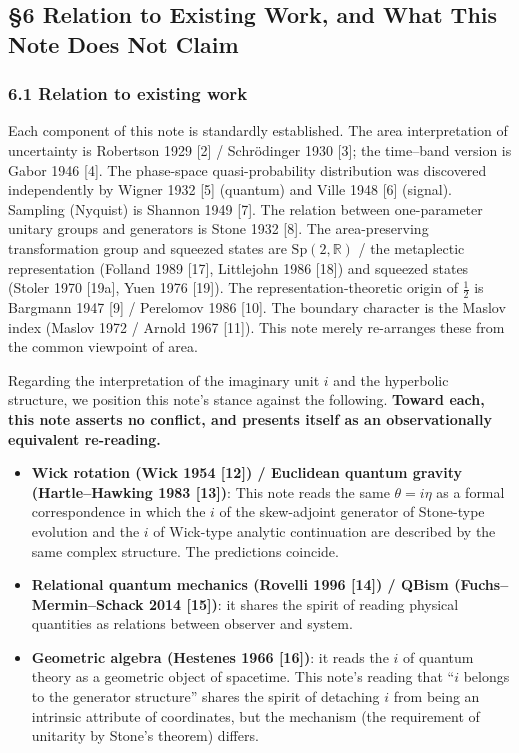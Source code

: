 \documentclass[
]{article}
\providecommand{\tightlist}{%
  \setlength{\itemsep}{0pt}\setlength{\parskip}{0pt}}
\begin{document}
\subsection{§6 Relation to Existing Work, and What This Note Does Not
Claim}\label{relation-to-existing-work-and-what-this-note-does-not-claim}

\subsubsection{6.1 Relation to existing
work}\label{relation-to-existing-work}

Each component of this note is standardly established. The area
interpretation of uncertainty is Robertson 1929 {[}2{]} / Schrödinger
1930 {[}3{]}; the time--band version is Gabor 1946 {[}4{]}. The
phase-space quasi-probability distribution was discovered independently
by Wigner 1932 {[}5{]} (quantum) and Ville 1948 {[}6{]} (signal).
Sampling (Nyquist) is Shannon 1949 {[}7{]}. The relation between
one-parameter unitary groups and generators is Stone 1932 {[}8{]}. The
area-preserving transformation group and squeezed states are
\(\mathrm{Sp}(2,\mathbb{R})\) / the metaplectic representation (Folland
1989 {[}17{]}, Littlejohn 1986 {[}18{]}) and squeezed states (Stoler
1970 {[}19a{]}, Yuen 1976 {[}19{]}). The representation-theoretic origin
of \(\tfrac12\) is Bargmann 1947 {[}9{]} / Perelomov 1986 {[}10{]}. The
boundary character is the Maslov index (Maslov 1972 / Arnold 1967
{[}11{]}). This note merely re-arranges these from the common viewpoint
of area.

Regarding the interpretation of the imaginary unit \(i\) and the
hyperbolic structure, we position this note's stance against the
following. \textbf{Toward each, this note asserts no conflict, and
presents itself as an observationally equivalent re-reading.}

\begin{itemize}
\tightlist
\item
  \textbf{Wick rotation (Wick 1954 {[}12{]}) / Euclidean quantum gravity
  (Hartle--Hawking 1983 {[}13{]})}: This note reads the same
  \(\theta=i\eta\) as a formal correspondence in which the \(i\) of the
  skew-adjoint generator of Stone-type evolution and the \(i\) of
  Wick-type analytic continuation are described by the same complex
  structure. The predictions coincide.
\item
  \textbf{Relational quantum mechanics (Rovelli 1996 {[}14{]}) / QBism
  (Fuchs--Mermin--Schack 2014 {[}15{]})}: it shares the spirit of
  reading physical quantities as relations between observer and system.
\item
  \textbf{Geometric algebra (Hestenes 1966 {[}16{]})}: it reads the
  \(i\) of quantum theory as a geometric object of spacetime. This
  note's reading that ``\(i\) belongs to the generator structure''
  shares the spirit of detaching \(i\) from being an intrinsic attribute
  of coordinates, but the mechanism (the requirement of unitarity by
  Stone's theorem) differs.
\end{itemize}
\end{document}
